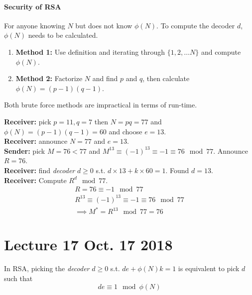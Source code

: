 \documentclass[10pt]{article}
\begin{document}
	    \paragraph{Security of RSA} For anyone knowing $N$ but does not know $\phi(N)$. To compute the decoder $d$, $\phi(N)$ needs to be calculated.
	    \begin{enumerate}
	        \item \textbf{Method 1:} Use definition and iterating through $\{1, 2, \dots N\}$ and compute $\phi(N)$.
	        \item \textbf{Method 2:} Factorize $N$ and find $p$ and $q$, then calculate $\phi(N) = (p-1)(q-1)$.
	    \end{enumerate}
	    Both brute force methods are impractical in terms of run-time.
	    
	    \begin{example} \textbf{Receiver: } pick $p=11, q=7$ then $N = pq = 77$ and $\phi(N) = (p-1)(q-1) = 60$ and choose $e=13$. \\
	    \textbf{Receiver: } announce $N=77$ and $e=13$. \\
	    \textbf{Sender: } pick $M = 76 < 77$ and $M^{13} \equiv (-1)^13 \equiv -1 \equiv 76 \mod 77$. Announce $R=76$. \\
	    \textbf{Receiver: } find \emph{decoder} $d \geq 0$ s.t. $d \times 13 + k \times 60 = 1$. Found $d = 13$. \\
	    \textbf{Receiver: } Compute $R^d \mod 77$. \\
	    \begin{gather*}
	        R = 76 \equiv -1 \mod 77 \\
	        R^{13} \equiv (-1)^{13} \equiv -1 \equiv 76 \mod 77 \\
	        \implies M^* = R^{13} \mod 77 = 76 
	    \end{gather*}
	    \end{example}
	\section{Lecture 17 Oct. 17 2018}
		\begin{remark}
			In RSA, picking the \emph{decoder} $d \geq 0$ s.t. $de + \phi(N)k = 1$ is equivalent to pick $d$ such that
			\[
				de \equiv 1 \mod \phi(N)
			\]
		\end{remark}
		
\end{document}
